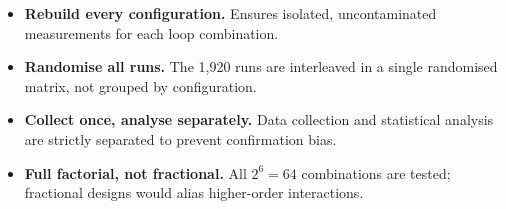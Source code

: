 \begin{itemize}
  \item \textbf{Rebuild every configuration.} Ensures isolated, uncontaminated
        measurements for each loop combination.
  \item \textbf{Randomise all runs.} The 1{,}920 runs are interleaved in a
        single randomised matrix, not grouped by configuration.
  \item \textbf{Collect once, analyse separately.} Data collection and statistical
        analysis are strictly separated to prevent confirmation bias.
  \item \textbf{Full factorial, not fractional.} All $2^6 = 64$ combinations are
        tested; fractional designs would alias higher-order interactions.
\end{itemize}
